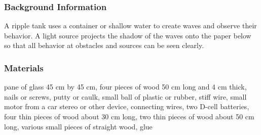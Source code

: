 \subsubsection*{Background Information}
A ripple tank uses a container or shallow water to create waves and observe their behavior. A light source projects the shadow of the waves onto the paper below so that all behavior at obstacles and sources can be seen clearly.

\subsubsection*{Materials}
pane of glass 45 cm by 45 cm, four pieces of wood 50 cm long and 4 cm thick, nails or screws, putty or caulk, small ball of plastic or rubber, stiff wire, small motor from a car stereo or other device, connecting wires, two D-cell batteries, four thin pieces of wood about 30 cm long, two thin pieces of wood about 50 cm long, various small pieces of straight wood, glue


